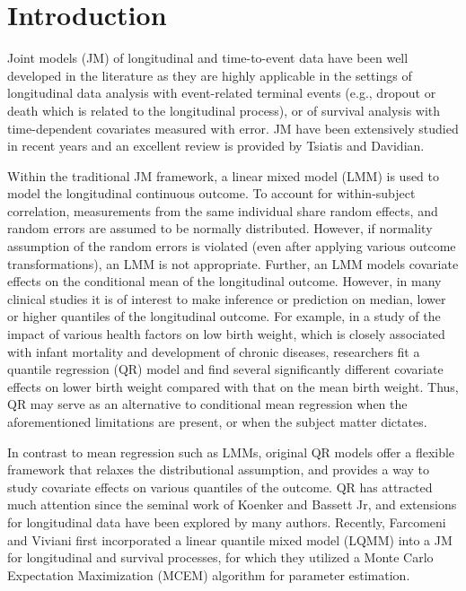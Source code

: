 \documentclass[Crown, sagev, times, doublespace]{sagej}
\begin{document}
\maketitle

\section{Introduction}
Joint models (JM) of longitudinal and time-to-event data have been well developed in the literature as they are highly applicable in the settings of longitudinal data analysis with event-related terminal events (e.g., dropout or death which is related to the longitudinal process), or of survival analysis with time-dependent covariates measured with error.\citep{self1992modeling, tsiatis1995modeling} JM have been extensively studied in recent years and an excellent review is provided by Tsiatis and Davidian.\cite{tsiatis2004joint}

Within the traditional JM framework, a linear mixed model (LMM) is used to model the longitudinal continuous outcome. To account for within-subject correlation, measurements from the same individual share random effects, and random errors are assumed to be normally distributed.\citep{laird1982random} However, if normality assumption of the random errors is violated (even after applying various outcome transformations), an LMM is not appropriate. Further, an LMM  models covariate effects on the conditional mean of the longitudinal outcome. However, in many clinical studies it is of interest to make inference or prediction on median, lower or higher quantiles of the longitudinal outcome. For example, in a study of the impact of various health factors on low birth weight, which is closely associated with infant mortality and development of chronic diseases, researchers fit a quantile regression (QR) model and find several significantly different covariate effects on lower birth weight compared with that on the mean birth weight.\citep{koenker2001quantile} Thus, QR may serve as an alternative to conditional mean regression when the aforementioned limitations are present, or when the subject matter dictates.

In contrast to mean regression such as LMMs, original QR models offer a flexible framework that relaxes the distributional assumption, and provides a way to study covariate effects on various quantiles of the outcome.\citep{koenker2005quantile} QR has attracted much attention since the seminal work of Koenker and Bassett Jr,\cite{koenker1978regression} and extensions for longitudinal data have been explored by many authors.\citep{koenker2004quantile, geraci2007quantile, geraci2013linear, kozumi2011gibbs} Recently, Farcomeni and Viviani \cite{farcomeni2015longitudinal} first incorporated a linear quantile mixed model (LQMM) into a JM for longitudinal and survival processes, for which they utilized a Monte Carlo Expectation Maximization (MCEM) algorithm for parameter estimation.
\end{document}
